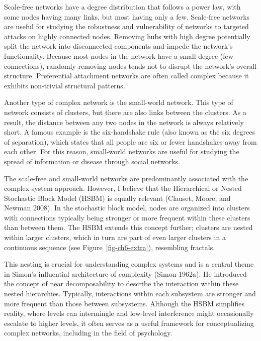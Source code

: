 \documentclass[
  a4paper,
  DIV=11,
  numbers=noendperiod,
  oneside]{scrreprt}
\begin{document}
Scale-free networks have a degree distribution that follows a power law,
with some nodes having many links, but most having only a few.
Scale-free networks are useful for studying the robustness and
vulnerability of networks to targeted attacks on highly connected nodes.
Removing hubs with high degree potentially split the network into
disconnected components and impede the network's functionality. Because
most nodes in the network have a small degree (few connections),
randomly removing nodes tends not to disrupt the network's overall
structure. Preferential attachment networks are often called complex
because it exhibits non-trivial structural patterns.

Another type of complex network is the small-world network. This type of
network consists of clusters, but there are also links between the
clusters. As a result, the distance between any two nodes in the network
is always relatively short. A famous example is the six-handshake rule
(also known as the six degrees of separation), which states that all
people are six or fewer handshakes away from each other. For this
reason, small-world networks are useful for studying the spread of
information or disease through social networks.

The scale-free and small-world networks are predominantly associated
with the complex system approach. However, I believe that the
Hierarchical or Nested Stochastic Block Model (HSBM) is equally relevant
(Clauset, Moore, and Newman 2008). In the stochastic block model, nodes
are organized into clusters with connections typically being stronger or
more frequent within these clusters than between them. The HSBM extends
this concept further; clusters are nested within larger clusters, which
in turn are part of even larger clusters in a continuous sequence (see
Figure~\ref{fig-ch6-extra}), resembling fractals.

This nesting is crucial for understanding complex systems and is a
central theme in Simon's influential architecture of complexity (Simon
1962a). He introduced the concept of near decomposability to describe
the interaction within these nested hierarchies. Typically, interactions
within each subsystem are stronger and more frequent than those between
subsystems. Although the HSBM simplifies reality, where levels can
intermingle and low-level interference might occasionally escalate to
higher levels, it often serves as a useful framework for conceptualizing
complex networks, including in the field of psychology.
\end{document}
